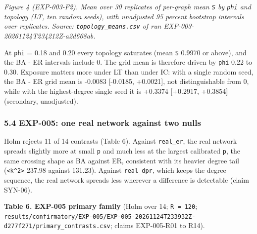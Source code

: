\documentclass[
]{article}
\begin{document}
\emph{Figure 4 (EXP-003-F2). Mean over 30 replicates of per-graph mean
\texttt{S} by \texttt{phi} and topology (LT, ten random seeds), with
unadjusted 95 percent bootstrap intervals over replicates. Source:
\texttt{topology\_means.csv} of run EXP-003-20261124T234212Z-a2d668ab.}

At \texttt{phi} = 0.18 and 0.20 every topology saturates (mean
\texttt{S} 0.9970 or above), and the BA - ER intervals include 0. The
grid mean is therefore driven by \texttt{phi} 0.22 to 0.30. Exposure
matters more under LT than under IC: with a single random seed, the BA -
ER grid mean is -0.0083 {[}-0.0185, +0.0021{]}, not distinguishable from
0, while with the highest-degree single seed it is +0.3374 {[}+0.2917,
+0.3854{]} (secondary, unadjusted).

\subsubsection{5.4 EXP-005: one real network against two
nulls}\label{exp-005-one-real-network-against-two-nulls}

Holm rejects 11 of 14 contrasts (Table 6). Against \texttt{real\_er},
the real network spreads slightly more at small \texttt{p} and much less
at the largest calibrated \texttt{p}, the same crossing shape as BA
against ER, consistent with its heavier degree tail
(\texttt{\textless{}k\^{}2\textgreater{}} 237.98 against 131.23).
Against \texttt{real\_dpr}, which keeps the degree sequence, the real
network spreads less wherever a difference is detectable (claim SYN-06).

\textbf{Table 6. EXP-005 primary family} (Holm over 14;
\texttt{R\ =\ 120};
\texttt{results/confirmatory/EXP-005/EXP-005-20261124T233932Z-d277f271/primary\_contrasts.csv};
claims EXP-005-R01 to R14).
\end{document}
